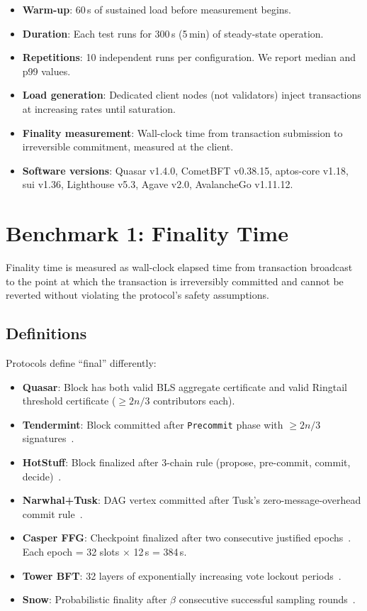 \documentclass[11pt]{article}
\begin{document}
\begin{itemize}
\item \textbf{Warm-up}: 60\,s of sustained load before measurement begins.
\item \textbf{Duration}: Each test runs for 300\,s (5\,min) of steady-state operation.
\item \textbf{Repetitions}: 10 independent runs per configuration. We report median
      and p99 values.
\item \textbf{Load generation}: Dedicated client nodes (not validators) inject
      transactions at increasing rates until saturation.
\item \textbf{Finality measurement}: Wall-clock time from transaction submission to
      irreversible commitment, measured at the client.
\item \textbf{Software versions}: Quasar v1.4.0, CometBFT v0.38.15, aptos-core v1.18,
      sui v1.36, Lighthouse v5.3, Agave v2.0, AvalancheGo v1.11.12.
\end{itemize}

\section{Benchmark 1: Finality Time}
\label{sec:finality}

Finality time is measured as wall-clock elapsed time from transaction broadcast to the
point at which the transaction is irreversibly committed and cannot be reverted without
violating the protocol's safety assumptions.

\subsection{Definitions}

Protocols define ``final'' differently:
\begin{itemize}
\item \textbf{Quasar}: Block has both valid BLS aggregate certificate and valid Ringtail
      threshold certificate ($\geq 2n/3$ contributors each).
\item \textbf{Tendermint}: Block committed after \texttt{Precommit} phase with $\geq 2n/3$
      signatures~\cite{tendermint}.
\item \textbf{HotStuff}: Block finalized after 3-chain rule (propose, pre-commit,
      commit, decide)~\cite{hotstuff}.
\item \textbf{Narwhal+Tusk}: DAG vertex committed after Tusk's zero-message-overhead
      commit rule~\cite{narwhal-tusk}.
\item \textbf{Casper FFG}: Checkpoint finalized after two consecutive justified
      epochs~\cite{casper-ffg}. Each epoch = 32 slots $\times$ 12\,s = 384\,s.
\item \textbf{Tower BFT}: 32 layers of exponentially increasing vote lockout
      periods~\cite{solana-wp}.
\item \textbf{Snow}: Probabilistic finality after $\beta$ consecutive successful
      sampling rounds~\cite{snow-paper}.
\end{itemize}
\end{document}
